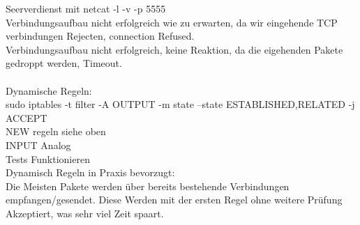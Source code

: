 \documentclass[12pt]{article}
\theoremstyle{plain}
\begin{document}
Seerverdienst mit netcat -l -v -p 5555\\
Verbindungsaufbau nicht erfolgreich wie zu erwarten, da wir eingehende TCP verbindungen Rejecten, connection Refused.\\
Verbindungsaufbau nicht erfolgreich, keine Reaktion, da die eigehenden Pakete gedroppt werden, Timeout.\\
\\
Dynamische Regeln:\\
sudo iptables -t filter -A OUTPUT -m state --state ESTABLISHED,RELATED -j ACCEPT\\
NEW regeln siehe oben\\
INPUT Analog\\
Tests Funktionieren\\
Dynamisch  Regeln in Praxis bevorzugt:\\
Die Meisten Pakete werden über bereits bestehende Verbindungen empfangen/gesendet. Diese Werden mit der ersten Regel ohne weitere Prüfung Akzeptiert, was sehr viel Zeit spaart.
\end{document}
